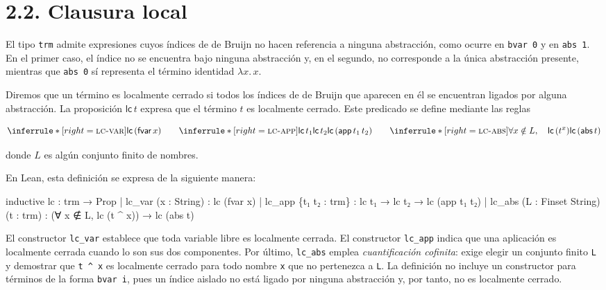 \documentclass[
  spanish,
  letterpaper,
  DIV=11,
  numbers=noendperiod]{scrreprt}
\newenvironment{Shaded}{\begin{snugshade}}{\end{snugshade}}
\newcommand{\KeywordTok}[1]{\textcolor[rgb]{0.00,0.23,0.31}{\textbf{#1}}}
\newcommand{\NormalTok}[1]{\textcolor[rgb]{0.00,0.23,0.31}{#1}}
\renewcommand{\NormalTok}[1]{\textcolor[HTML]{000000}{#1}}
\renewcommand{\KeywordTok}[1]{\textcolor[HTML]{0000FF}{#1}}
\theoremstyle{remark}
\begin{document}
\section{2.2. Clausura local}\label{clausura-local}

El tipo \texttt{trm} admite expresiones cuyos índices de de Bruijn no
hacen referencia a ninguna abstracción, como ocurre en \texttt{bvar\ 0}
y en \texttt{abs\ 1}. En el primer caso, el índice no se encuentra bajo
ninguna abstracción y, en el segundo, no corresponde a la única
abstracción presente, mientras que \texttt{abs\ 0} sí representa el
término identidad \(\lambda x.\,x\).

Diremos que un término es localmente cerrado si todos los índices de de
Bruijn que aparecen en él se encuentran ligados por alguna abstracción.
La proposición \(\mathsf{lc} \, t\) expresa que el término \(t\) es
localmente cerrado. Este predicado se define mediante las reglas

\[
\inferrule*[right=\textsc{lc-var}]
  { }
  {\mathsf{lc} \, (\mathsf{fvar}\,x)}
\qquad
\inferrule*[right=\textsc{lc-app}]
  {\mathsf{lc} \, t_1 \\ \mathsf{lc} \, t_2}
  {\mathsf{lc} \, (\mathsf{app} \, t_1 \, t_2)}
\qquad
\inferrule*[right=\textsc{lc-abs}]
  {\forall x \notin L, \quad \mathsf{lc} \, (t^x)}
  {\mathsf{lc} \, (\mathsf{abs}\,t)}
\]

donde \(L\) es algún conjunto finito de nombres.

En Lean, esta definición se expresa de la siguiente manera:

\begin{Shaded}
\begin{Highlighting}[]
\NormalTok{inductive lc : trm → }\KeywordTok{Prop}
\NormalTok{  | lc\_var (x : String) :}
\NormalTok{      lc (fvar x)}
\NormalTok{  | lc\_app \{t₁ t₂ : trm\} :}
\NormalTok{      lc t₁ → lc t₂ → lc (app t₁ t₂)}
\NormalTok{  | lc\_abs (L : Finset String) (t : trm) :}
\NormalTok{      (∀ x ∉ L, lc (t \^{} x)) →}
\NormalTok{      lc (abs t)}
\end{Highlighting}
\end{Shaded}

El constructor \texttt{lc\_var} establece que toda variable libre es
localmente cerrada. El constructor \texttt{lc\_app} indica que una
aplicación es localmente cerrada cuando lo son sus dos componentes. Por
último, \texttt{lc\_abs} emplea \emph{cuantificación cofinita}: exige
elegir un conjunto finito \texttt{L} y demostrar que \texttt{t\ \^{}\ x}
es localmente cerrado para todo nombre \texttt{x} que no pertenezca a
\texttt{L}. La definición no incluye un constructor para términos de la
forma \texttt{bvar\ i}, pues un índice aislado no está ligado por
ninguna abstracción y, por tanto, no es localmente cerrado.
\end{document}
